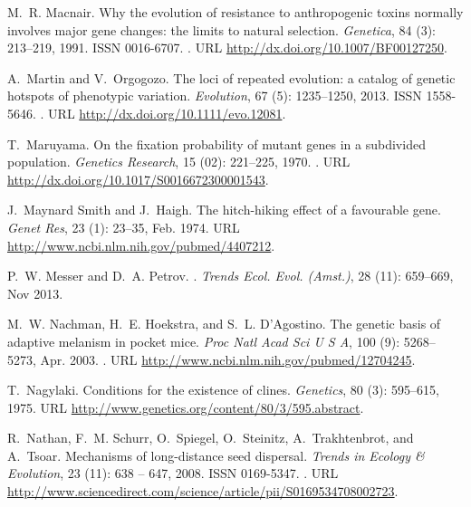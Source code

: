 \documentclass[10pt,letterpaper]{article}
\begin{document}
\begin{thebibliography}{68}
M.~R. Macnair.
\newblock Why the evolution of resistance to anthropogenic toxins normally
  involves major gene changes: the limits to natural selection.
\newblock \emph{Genetica}, 84 (3): 213--219, 1991.
\newblock ISSN 0016-6707.
\newblock {}.
\newblock URL \url{http://dx.doi.org/10.1007/BF00127250}.

A.~Martin and V.~Orgogozo.
\newblock The loci of repeated evolution: a catalog of genetic hotspots of
  phenotypic variation.
\newblock \emph{Evolution}, 67 (5): 1235--1250, 2013.
\newblock ISSN 1558-5646.
\newblock {}.
\newblock URL \url{http://dx.doi.org/10.1111/evo.12081}.

T.~Maruyama.
\newblock On the fixation probability of mutant genes in a subdivided
  population.
\newblock \emph{Genetics Research}, 15 (02): 221--225, 1970.
\newblock {}.
\newblock URL \url{http://dx.doi.org/10.1017/S0016672300001543}.

J.~{Maynard Smith} and J.~Haigh.
\newblock The hitch-hiking effect of a favourable gene.
\newblock \emph{Genet Res}, 23 (1): 23--35, Feb. 1974.
\newblock URL \url{http://www.ncbi.nlm.nih.gov/pubmed/4407212}.

P.~W. Messer and D.~A. Petrov.
.
\newblock \emph{Trends Ecol. Evol. (Amst.)}, 28 (11):
  659--669, Nov 2013.

M.~W. Nachman, H.~E. Hoekstra, and S.~L. D'Agostino.
\newblock The genetic basis of adaptive melanism in pocket mice.
\newblock \emph{Proc Natl Acad Sci U S A}, 100 (9):
  5268--5273, Apr. 2003.
\newblock {}.
\newblock URL \url{http://www.ncbi.nlm.nih.gov/pubmed/12704245}.

T.~Nagylaki.
\newblock Conditions for the existence of clines.
\newblock \emph{Genetics}, 80 (3): 595--615, 1975.
\newblock URL \url{http://www.genetics.org/content/80/3/595.abstract}.

R.~Nathan, F.~M. Schurr, O.~Spiegel, O.~Steinitz, A.~Trakhtenbrot, and
  A.~Tsoar.
\newblock Mechanisms of long-distance seed dispersal.
\newblock \emph{Trends in Ecology \& Evolution}, 23 (11): 638
  -- 647, 2008.
\newblock ISSN 0169-5347.
\newblock {}.
\newblock URL
  \url{http://www.sciencedirect.com/science/article/pii/S0169534708002723}.


\end{thebibliography}
\end{document}
